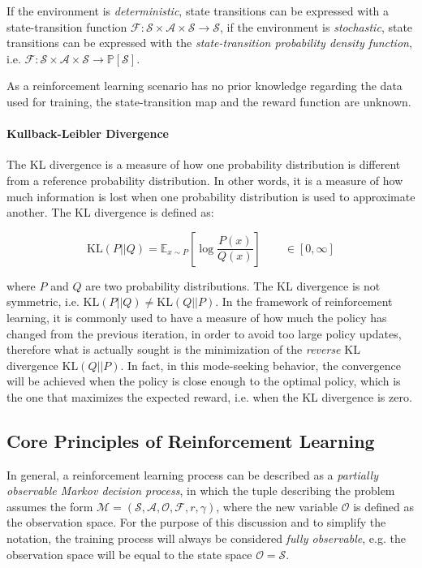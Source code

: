 If the environment is \textit{deterministic}, state transitions can be expressed with a state-transition function $\mathcal{F}: \mathcal{S} \times \mathcal{A} \times \mathcal{S} \rightarrow \mathcal{S}$, if the environment is \textit{stochastic}, state transitions can be expressed with the \textit{state-transition probability density function}, i.e. $\mathcal{F}: \mathcal{S} \times \mathcal{A} \times \mathcal{S} \rightarrow \mathbb{P}[\mathcal{S}]$.

As a reinforcement learning scenario has no prior knowledge regarding the data used for training, the state-transition map and the reward function are unknown.


\paragraph{Kullback-Leibler Divergence} The \ac{KL} divergence is a measure of how one probability distribution is different from a reference probability distribution. In other words, it is a measure of how much information is lost when one probability distribution is used to approximate another. The \ac{KL} divergence is defined as:

\begin{equation}
    \mathrm{KL}(P||Q) = \mathbb{E} _{x \sim P} \left[ \log \frac{P(x)}{Q(x)} \right] \qquad \in \left[0, \infty \right]
\end{equation}

where $P$ and $Q$ are two probability distributions. The \ac{KL} divergence is not symmetric, i.e. $\mathrm{KL}(P||Q) \neq \mathrm{KL}(Q||P)$. In the framework of reinforcement learning, it is commonly used to have a measure of how much the policy has changed from the previous iteration, in order to avoid too large policy updates, therefore what is actually sought is the minimization of the \textit{reverse} \ac{KL} divergence $\mathrm{KL}(Q||P)$. In fact, in this mode-seeking behavior, the convergence will be achieved when the policy is close enough to the optimal policy, which is the one that maximizes the expected reward, i.e. when the \ac{KL} divergence is zero.

\subsection{Core Principles of Reinforcement Learning}

In general, a reinforcement learning process can be described as a \textit{partially observable Markov decision process}, in which the tuple describing the problem assumes the form $\mathcal{M} =  (\mathcal{S}, \mathcal{A}, \mathcal{O}, \mathcal{F}, r, \gamma)$, where the new variable $\mathcal{O}$ is defined as the observation space. For the purpose of this discussion and to simplify the notation, the training process will always be considered \textit{fully observable}, e.g. the observation space will be equal to the state space $\mathcal{O} = \mathcal{S}$.

